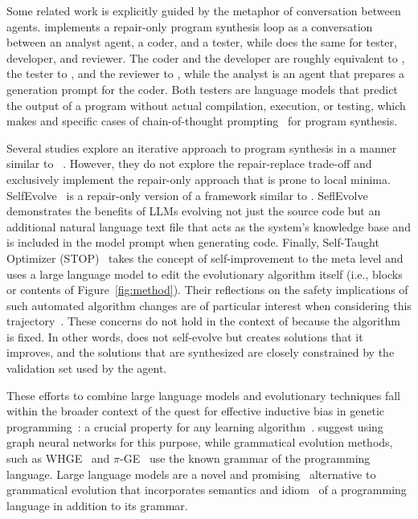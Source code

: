 Some related work is explicitly guided by the metaphor of conversation between agents. 
\citet{zhang2023steam} implements a repair-only program synthesis loop as a conversation between an analyst agent, a coder, and a tester, while \citep{dong2024:selfcollaboration} does the same for tester, developer, and reviewer. 
The coder and the developer are roughly equivalent to \synthesize{}, the tester to \execute{}, and the reviewer to \instruct{}, while the analyst is an agent that prepares a generation prompt for the coder. 
Both testers are language models that predict the output of a program without actual compilation, execution, or testing, which makes \citet{dong2024:selfcollaboration} and \citet{zhang2023steam} specific cases of chain-of-thought prompting~\cite{yu2023:better} for program synthesis.

Several studies explore an iterative approach to program synthesis in a manner similar to \method{}~\citep{xia2023:conversational,chen2023:teaching,shinn2023:reflexion}. 
However, they do not explore the repair-replace trade-off and exclusively implement the repair-only approach that is prone to local minima.
SelfEvolve~\citep{jiang2023:selfevolve} is a repair-only version of a framework similar to \method{}.
SeflEvolve demonstrates the benefits of LLMs evolving not just the source code but an additional natural language text file that acts as the system's knowledge base and is included in the model prompt when generating code. 
Finally, Self-Taught Optimizer (STOP)~\cite{zelikman2023:selftaught} takes the concept of self-improvement to the meta level and uses a large language model to edit the evolutionary algorithm itself (i.e., blocks or contents of Figure~\ref{fig:method}). 
Their reflections on the safety implications of such automated algorithm changes are of particular interest when considering this trajectory~\cite[Section 8]{zelikman2023:selftaught}. These concerns do not hold in the context of \method{} because the algorithm is fixed.
In other words, \method{} does not self-evolve but creates solutions that it improves, and the solutions that are synthesized are closely constrained by the validation set used by the \execute{} agent.

These efforts to combine large language models and evolutionary techniques fall within the broader context of the quest for effective inductive bias in genetic programming~\citep{whighamSearchBiasLanguage1996}: a crucial property for any learning algorithm~\citep{haussler1988:quantifying}. 
\citet{reuterGraphNetworksInductive2023} suggest using graph neural networks for this purpose, while grammatical evolution methods, such as WHGE~\citep{bartoliWeightedHierarchicalGrammatical2020} and $\pi$-GE~\citep{oneill2004:pgrammatical} use the known grammar of the programming language.
Large language models are a novel and promising~\citep{custodeComparingLargeLanguage2024} alternative to grammatical evolution that incorporates semantics and idiom~\citep{allamanisMiningIdiomsSource2014,orlovFindingIdiomsSource2020} of a programming language in addition to its grammar. 


